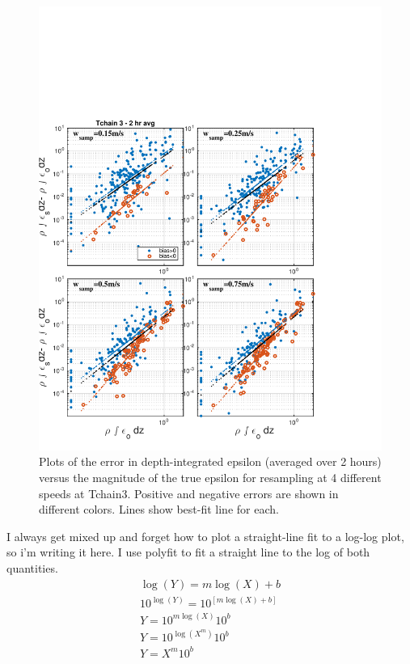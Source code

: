 \documentclass[11pt]{article}
\begin{document}
\begin{figure}[htbp]
\includegraphics[scale=0.8]{Tchain3_4Speeds_IntEps_ErrorvsTrue.pdf}
\caption{Plots of the error in depth-integrated epsilon (averaged over 2 hours) versus the magnitude of the true epsilon for resampling at 4 different speeds at Tchain3. Positive and negative errors are shown in different colors. Lines show best-fit line for each.}
\label{}
\end{figure}

\vspace{1cm}

I always get mixed up and forget how to plot a straight-line fit to a log-log plot, so i'm writing it here. I use polyfit to fit a straight line to the log of both quantities.
\begin{eqnarray}
\log(Y)=m\log(X) +b\\
10^{\log(Y)}=10^{[m\log(X) +b]}\\
Y=10^{m\log(X)} 10^b\\
Y=10^{\log(X^m)} 10^b\\
Y=X^m 10^b\\
\end{eqnarray}
\end{document}
